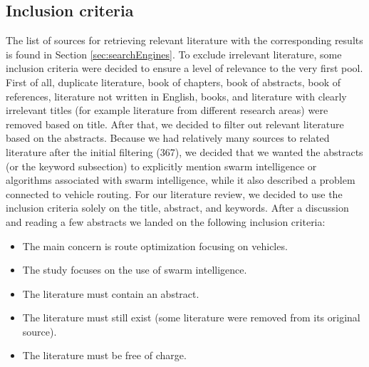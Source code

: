



\subsection{Inclusion criteria}
\label{sec:inclusionCriteria}
The list of sources for retrieving relevant literature with the corresponding results is found in Section \vref{sec:searchEngines}. To exclude irrelevant literature, some inclusion criteria were decided to ensure a level of relevance to the very first pool. First of all, duplicate literature, book of chapters, book of abstracts, book of references, literature not written in English, books, and literature with clearly irrelevant titles (for example literature from different research areas) were removed based on title. After that, we decided to filter out relevant literature based on the abstracts. Because we had relatively many sources to related literature after the initial filtering (367), we decided that we wanted the abstracts (or the keyword subsection) to explicitly mention swarm intelligence or algorithms associated with swarm intelligence, while it also described a problem connected to vehicle routing. For our literature review, we decided to use the inclusion criteria solely on the title, abstract, and keywords. After a discussion and reading a few abstracts we landed on the following inclusion criteria:
\begin{itemize}
\item The main concern is route optimization focusing on vehicles. 
\item The study focuses on the use of swarm intelligence.
\item The literature must contain an abstract. 
\item The literature must still exist (some literature were removed from its original source).
\item The literature must be free of charge.
\end{itemize}

